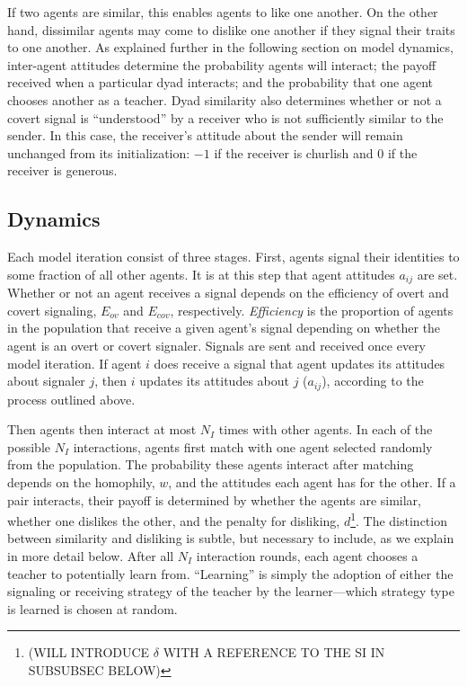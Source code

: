 \documentclass[11pt,letterpaper]{article}
\begin{document}
If two agents are similar, this enables agents to like one another. On the
other hand, dissimilar agents may come to dislike one another if they signal
their traits to one another. As explained further in the following section on
model dynamics, inter-agent attitudes determine the probability agents will
interact; the payoff received when a particular dyad interacts; and the
probability that one agent chooses another as a teacher. Dyad similarity 
also determines whether or not a covert signal is ``understood'' by a 
receiver who is not sufficiently similar to the sender. In this case, the
receiver's attitude about the sender will remain unchanged from its
initialization: $-1$ if the receiver is churlish and $0$ if the receiver is
generous.

\subsection{Dynamics}

Each model iteration consist of three stages. First, agents signal their identities
to some fraction of all other agents. It is at this step that agent attitudes
$a_{ij}$ are set. Whether or not an agent receives a signal depends on the
efficiency of overt and covert signaling, $E_{ov}$ and $E_{cov}$, respectively.
\emph{Efficiency} is the proportion of agents in the population that receive
a given agent's signal depending on whether the agent is an overt or covert
signaler.  Signals are sent and received once every model iteration. 
If agent $i$ does receive a signal that agent updates its attitudes about
signaler $j$, then $i$ updates its attitudes about $j$ ($a_{ij}$), according to
the process outlined above.

Then agents then
interact at most $N_I$ times with other agents. In each of the possible 
$N_I$ interactions, agents first match with one agent selected randomly from
the population. The probability these agents interact after matching depends
on the homophily, $w$, and the attitudes each agent has for the other. 
If a pair interacts, their payoff is determined by whether the agents are
similar, whether one dislikes the other, and the penalty for disliking,
$d$\footnote{(WILL INTRODUCE $\delta$ WITH A REFERENCE TO THE SI IN SUBSUBSEC
BELOW)}. The distinction between similarity and disliking is subtle, 
but necessary to include, as we explain in more detail below. After all
$N_I$ interaction rounds, each agent chooses a teacher to potentially learn
from. ``Learning'' is simply the adoption of either the signaling or
receiving strategy of the teacher by the learner---which strategy type is 
learned is chosen at random. 
\end{document}
